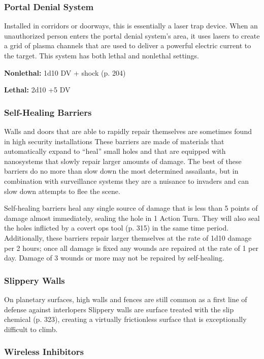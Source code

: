 \subsubsection{Portal Denial System} 

Installed in corridors or doorways, this is essentially a laser trap device. When an unauthorized person enters the portal denial system's area, it uses lasers to create a grid of plasma channels that are used to deliver a powerful electric current to the target. This system has both lethal and nonlethal settings. 

\textbf{Nonlethal:} 1d10 DV + shock (p. 204) 

\textbf{Lethal:} 2d10 +5 DV 

\subsubsection{Self-Healing Barriers} 

Walls and doors that are able to rapidly repair themselves are sometimes found in high security installations These barriers are made of materials that automatically expand to ``heal'' small holes and that are equipped with nanosystems that slowly repair larger amounts of damage. The best of these barriers do no more than slow down the most determined assailants, but in combination with surveillance systems they are a nuisance to invaders and can slow down attempts to flee the scene. 

Self-healing barriers heal any single source of damage that is less than 5 points of damage almost immediately, sealing the hole in 1 Action Turn. They will also seal the holes inflicted by a covert ops tool (p. 315) in the same time period. Additionally, these barriers repair larger themselves at the rate of 1d10 damage per 2 hours; once all damage is fixed any wounds are repaired at the rate of 1 per day. Damage of 3 wounds or more may not be repaired by self-healing. 

\subsubsection{Slippery Walls} 

On planetary surfaces, high walls and fences are still common as a first line of defense against interlopers Slippery walls are surface treated with the slip chemical (p. 323), creating a virtually frictionless surface that is exceptionally difficult to climb. 

\subsubsection{Wireless Inhibitors} 

